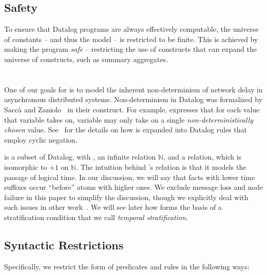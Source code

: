 \subsection{Safety}

To ensure that Datalog programs are always effectively computable, the universe
of constants -- and thus the model -- is restricted to be finite.  This is
achieved by making the program {\em safe} -- restricting the use of constructs
that can expand the universe of constructs, such as summary aggregates.

\section{\lang}

One of our goals for \lang is
to model the inherent non-determinism of network delay in asynchronous
distributed systems.  Non-determinism in Datalog was formalized by Sacc\`{a}
and Zaniolo~\cite{sacca-zaniolo} in their  construct.  For
example,  expresses that for each
value that variable  takes on, variable  may only take on
a single {\em non-deterministically chosen} value.  See~\cite{sacca-zaniolo}
for the details on how  is expanded into Datalog rules that
employ cyclic negation.

\lang is a subset of Datalog, with , an infinite
 relation $\mathbb{N}$, and a 
relation, which is isomorphic to $+1$ on $\mathbb{N}$.  The intuition behind
\lang's  relation is that it models the passage of logical
time.  In our discussion, we will say that facts with lower time suffixes occur
``before'' atoms with higher ones.  
We exclude message loss and node failure in this paper to
simplify the discussion, though we explicitly deal with such issues in other
work~\cite{dedalus-techr, netdb}.
We will see later how  forms the basis of a stratification
condition that we call {\em temporal stratification}.

\subsection{Syntactic Restrictions}
\label{sec:syntaxrestrictions}

Specifically, we restrict the form of predicates and rules in the following ways:

